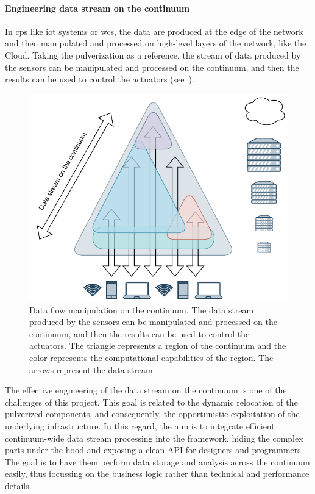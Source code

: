 \documentclass[12pt,a4paper]{article}
\begin{document}
\paragraph{Engineering data stream on the continuum}\label{sec:eng-data-stream}
In \ac{cps} like \ac{iot} systems or \ac{wcs},
the data are produced at the edge of the network and then manipulated and processed on high-level layers of the network, like the Cloud.
%
Taking the pulverization as a reference,
the stream of data produced by the sensors can be manipulated and processed on the continuum,
and then the results can be used to control the actuators (see~).
%
\begin{figure}[ht]
	\centering
	\includegraphics[width=.46\textwidth]{img/data-stream.drawio.pdf}
	\caption{
		Data flow manipulation on the continuum.
		The data stream produced by the sensors can be manipulated and processed on the continuum,
		and then the results can be used to control the actuators.
		The triangle represents a region of the continuum and the color represents the computational capabilities of the region.
		The arrows represent the data stream.
		}
	\label{fig:data-stream}
\end{figure}
%
The effective engineering of the data stream on the continuum is one of the challenges of this project.
%
This goal is related to the dynamic relocation of the pulverized components,
and consequently,
the opportunistic exploitation of the underlying infrastructure.
%
In this regard,
the aim is to integrate efficient continuum-wide data stream processing into the framework,
hiding the complex parts under the hood and exposing a clean API for designers and programmers.
The goal is to have them perform data storage and analysis across the continuum easily,
thus focussing on the business logic rather than technical and performance details.
\end{document}
